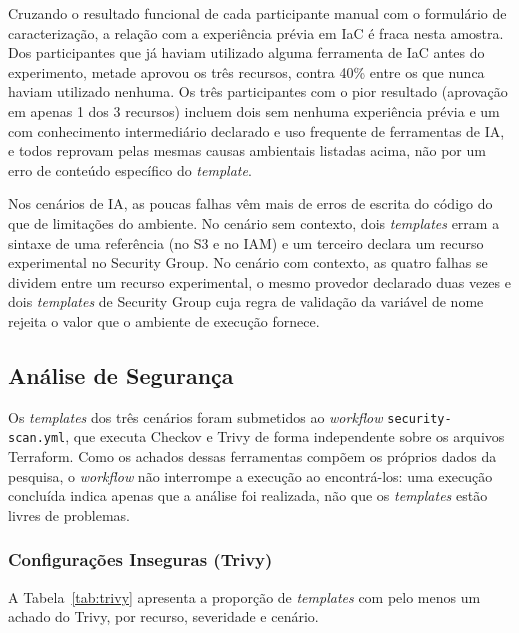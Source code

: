 Cruzando o resultado funcional de cada participante manual com o formulário de caracterização, a relação com a experiência prévia em IaC é fraca nesta amostra. Dos participantes que já haviam utilizado alguma ferramenta de IaC antes do experimento, metade aprovou os três recursos, contra 40\% entre os que nunca haviam utilizado nenhuma. Os três participantes com o pior resultado (aprovação em apenas 1 dos 3 recursos) incluem dois sem nenhuma experiência prévia e um com conhecimento intermediário declarado e uso frequente de ferramentas de IA, e todos reprovam pelas mesmas causas ambientais listadas acima, não por um erro de conteúdo específico do \textit{template}.

Nos cenários de IA, as poucas falhas vêm mais de erros de escrita do código do que de limitações do ambiente. No cenário sem contexto, dois \textit{templates} erram a sintaxe de uma referência (no S3 e no IAM) e um terceiro declara um recurso experimental no Security Group. No cenário com contexto, as quatro falhas se dividem entre um recurso experimental, o mesmo provedor declarado duas vezes e dois \textit{templates} de Security Group cuja regra de validação da variável de nome rejeita o valor que o ambiente de execução fornece.

\subsection{Análise de Segurança}

Os \textit{templates} dos três cenários foram submetidos ao \textit{workflow} \texttt{security-scan.yml}, que executa Checkov e Trivy de forma independente sobre os arquivos Terraform. Como os achados dessas ferramentas compõem os próprios dados da pesquisa, o \textit{workflow} não interrompe a execução ao encontrá-los: uma execução concluída indica apenas que a análise foi realizada, não que os \textit{templates} estão livres de problemas.

\subsubsection{Configurações Inseguras (Trivy)}

A Tabela~\ref{tab:trivy} apresenta a proporção de \textit{templates} com pelo menos um achado do Trivy, por recurso, severidade e cenário.

